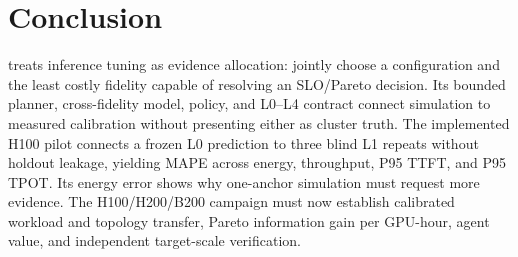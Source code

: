 \section{Conclusion}

\system{} treats inference tuning as evidence allocation: jointly choose a
configuration and the least costly fidelity capable of resolving an SLO/Pareto
decision.  Its bounded planner, cross-fidelity model, \ipig{} policy, and L0--L4
contract connect simulation to measured calibration without presenting either
as cluster truth.  The implemented H100 pilot connects a frozen L0 prediction
to three blind L1 repeats without holdout leakage, yielding \PilotMeanMAPE{}
MAPE across energy, throughput, P95 TTFT, and P95 TPOT.  Its
\PilotEnergyAPE{} energy error shows why one-anchor simulation must request
more evidence.  The H100/H200/B200 campaign must now establish calibrated
workload and topology transfer, Pareto information gain per GPU-hour, agent
value, and independent target-scale verification.
